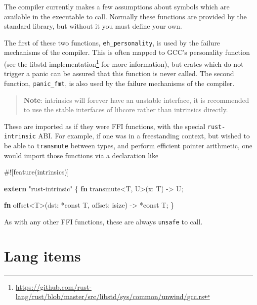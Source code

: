 \documentclass[a4paper,]{book}
\newenvironment{Shaded}{\begin{snugshade}}{\end{snugshade}}
\newcommand{\KeywordTok}[1]{\textcolor[rgb]{0.13,0.29,0.53}{\textbf{{#1}}}}
\newcommand{\StringTok}[1]{\textcolor[rgb]{0.31,0.60,0.02}{{#1}}}
\newcommand{\NormalTok}[1]{{#1}}
\renewcommand{\href}[2]{#2\footnote{\url{#1}}}
\begin{document}
The compiler currently makes a few assumptions about symbols which are
available in the executable to call. Normally these functions are
provided by the standard library, but without it you must define your
own.

The first of these two functions, \texttt{eh\_personality}, is used by
the failure mechanisms of the compiler. This is often mapped to GCC's
personality function (see the
\href{https://github.com/rust-lang/rust/blob/master/src/libstd/sys/common/unwind/gcc.rs}{libstd
implementation} for more information), but crates which do not trigger a
panic can be assured that this function is never called. The second
function, \texttt{panic\_fmt}, is also used by the failure mechanisms of
the compiler.


\begin{quote}
\textbf{Note}: intrinsics will forever have an unstable interface, it is
recommended to use the stable interfaces of libcore rather than
intrinsics directly.
\end{quote}

These are imported as if they were FFI functions, with the special
\texttt{rust-intrinsic} ABI. For example, if one was in a freestanding
context, but wished to be able to \texttt{transmute} between types, and
perform efficient pointer arithmetic, one would import those functions
via a declaration like

\begin{Shaded}
\begin{Highlighting}[]
\NormalTok{#![feature(intrinsics)]}

\KeywordTok{extern} \StringTok{"rust-intrinsic"} \NormalTok{\{}
    \KeywordTok{fn} \NormalTok{transmute<T, U>(x: T) -> U;}

    \KeywordTok{fn} \NormalTok{offset<T>(dst: *const T, offset: isize) -> *const T;}
\NormalTok{\}}
\end{Highlighting}
\end{Shaded}

As with any other FFI functions, these are always \texttt{unsafe} to
call.

\section{Lang items}\label{sec--lang-items}
\end{document}
